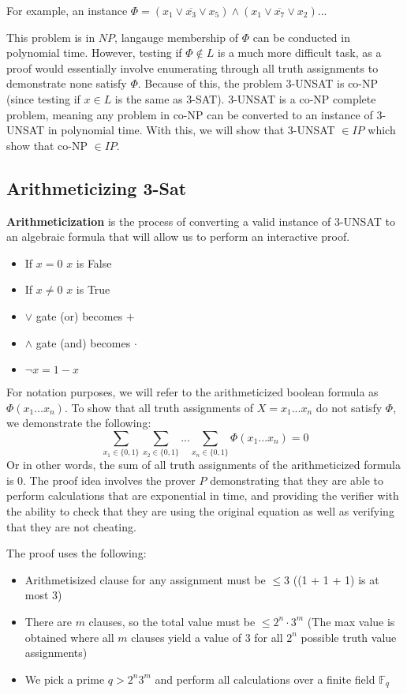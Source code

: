 \documentclass[11pt]{article}
\begin{document}
For example, an instance $\Phi = (x_1 \lor \overline{x_3} \lor x_5) \land (x_1 \lor \overline{x_7} \lor x_2) ...$
\vspace{1em}

This problem is in $NP$, langauge membership of $\Phi$ can be conducted in polynomial time. However, testing if $\Phi \notin L$ is a much more difficult task, as a proof would essentially involve enumerating through all truth assignments to demonstrate none satisfy $\Phi$. Because of this, the problem $3$-UNSAT is co-NP (since testing if $x \in L$ is the same as 3-SAT). 3-UNSAT is a co-NP complete problem, meaning any problem in co-NP can be converted to an instance of 3-UNSAT in polynomial time. With this, we will show that 3-UNSAT $\in IP$ which show that co-NP $\in IP$.

\subsection{Arithmeticizing 3-Sat}
\textbf{Arithmeticization} is the process of converting a valid instance of 3-UNSAT to an algebraic formula that will allow us to perform an interactive proof.
\begin{itemize}
\item If $x = 0$ $x$ is False
\item If $x \neq 0$ $x$ is True
\item $\lor$ gate (or) becomes $+$
\item $\land$ gate (and) becomes $\cdot$
\item $\lnot x = 1-x$
\end{itemize}
For notation purposes, we will refer to the arithmeticized boolean formula as $\Phi(x_1...x_n)$. To show that all truth assignments of $X=x_1...x_n$ do not satisfy $\Phi$, we demonstrate the following:
$$\sum\limits_{x_1 \in \{0,1\}}\sum\limits_{x_2 \in \{0,1\}}...\sum\limits_{x_n \in \{0,1\}} \Phi(x_1...x_n) = 0$$
Or in other words, the sum of all truth assignments of the arithmeticized formula is 0. The proof idea involves the prover $P$ demonstrating that they are able to perform calculations that are exponential in time, and providing the verifier with the ability to check that they are using the original equation as well as verifying that they are not cheating.
\vspace{1em}

The proof uses the following:
\begin{itemize}
\item Arithmetisized clause for any assignment must be $\leq 3$ ((1 + 1 + 1) is at most 3)
\item There are $m$ clauses, so the total value must be $\leq 2^n \cdot 3^m$ (The max value is obtained where all $m$ clauses yield a value of $3$ for all $2^n$ possible truth value assignments)
\item We pick a prime $q > 2^n3^m$ and perform all calculations over a finite field $\mathbb{F}_{q}$
\end{itemize}
\end{document}
